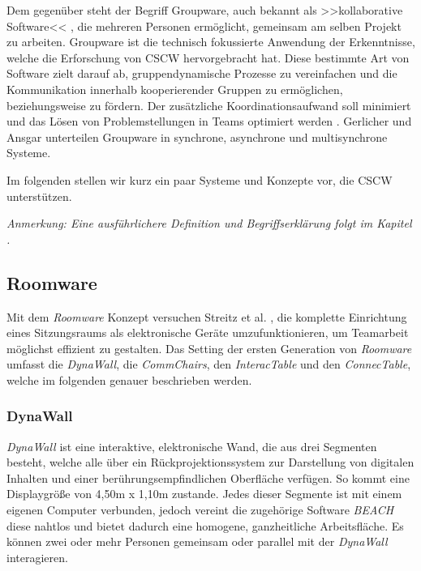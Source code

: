 Dem gegenüber steht der Begriff Groupware, auch bekannt als >>kollaborative Software<< \citep{Bannon:1990p244}, die mehreren Personen ermöglicht, gemeinsam am selben Projekt zu arbeiten. Groupware ist die technisch fokussierte Anwendung der Erkenntnisse, welche die Erforschung von CSCW hervorgebracht hat. Diese bestimmte Art von Software zielt darauf ab, gruppendynamische Prozesse zu vereinfachen und die Kommunikation innerhalb kooperierender Gruppen zu ermöglichen, beziehungsweise zu fördern. Der zusätzliche Koordinationsaufwand soll minimiert und das Lösen von Problemstellungen in Teams optimiert werden \citep{Rama:2006p245}. Gerlicher und Ansgar \citep{Gerlicher:2007p241} unterteilen Groupware in synchrone, asynchrone und multisynchrone Systeme.

Im folgenden stellen wir kurz ein paar Systeme und Konzepte vor, die CSCW unterstützen. 

\bigskip \emph{Anmerkung: \graffito{\(\clubsuit\)} Eine ausführlichere Definition und Begriffserklärung folgt im Kapitel .}

\subsection{Roomware}

Mit dem \emph{Roomware} Konzept versuchen Streitz et al. \citep{Streitz:2001p213, Streitz:2002p214, Tandler:2002p219}, die komplette Einrichtung eines Sitzungsraums als elektronische Geräte umzufunktionieren, um Teamarbeit möglichst effizient zu gestalten. Das Setting der ersten Generation von \emph{Roomware} \citep{Streitz:2001p213} umfasst die \emph{DynaWall}, die \emph{CommChairs}, den \emph{InteracTable} und den \emph{ConnecTable}, welche im folgenden genauer beschrieben werden.

\subsubsection{DynaWall}

\emph{DynaWall} ist eine interaktive, elektronische Wand, die aus drei Segmenten besteht, welche alle über ein Rückprojektionssystem zur Darstellung von digitalen Inhalten und einer berührungsempfindlichen Oberfläche verfügen. So kommt eine Displaygröße von 4,50m x 1,10m zustande. Jedes dieser Segmente ist mit einem eigenen Computer verbunden, jedoch vereint die zugehörige Software \emph{BEACH} \citep{Tandler:2000p238} diese nahtlos und bietet dadurch eine homogene, ganzheitliche Arbeitsfläche. Es können zwei oder mehr Personen gemeinsam oder parallel mit der \emph{DynaWall} interagieren. 

